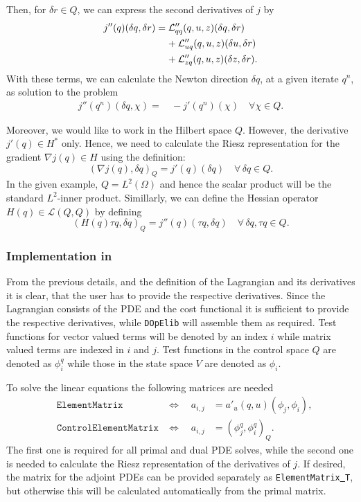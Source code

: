 {Then, for $\delta r\in Q$, we can express the second derivatives of $j$ by
\begin{align*}
j''(q)(\delta q, \delta r) 
&= {\cal L}_{qq}'' (q,u,z)(\delta q,\delta r) \\
&\;\;\;\;+ {\cal L}_{uq}'' (q,u,z)(\delta u,\delta r) \\ 
&\;\;\;\;+ {\cal L}_{zq}'' (q,u,z)(\delta z,\delta r).
\end{align*}
With these terms, we can calculate the Newton direction $\delta q$, at a given 
iterate $q^n$, as solution to the problem
\begin{align*}
j''(q^n )(\delta q,\chi ) =&\, -j'(q^n)(\chi) \quad\forall\chi \in Q.
\end{align*}

Moreover, we would like to work in the Hilbert space $Q$. However, the derivative 
$j'(q) \in H^*$ only. Hence, we need to calculate the Riesz representation 
for the gradient $\nabla j(q) \in H$ using the definition:
\[
 (\nabla j(q),\delta q)_Q = j'(q)(\delta q) \quad \forall\,\delta q\in Q.
\]
In the given example, $Q = L^2(\Omega)$ and hence the scalar product will be the
standard $L^2$-inner product. Simillarly, we can define the Hessian operator 
$H(q) \in \mathcal L(Q,Q)$ by defining
\[
 (H(q)\tau q,\delta q)_Q = j''(q)(\tau q,\delta q) \quad \forall\,\delta q,\tau q\in Q.
\]
}

\subsubsection{Implementation in \dope{}}
From the previous details, and the definition of the Lagrangian and its 
derivatives it is clear, that the user has to provide the respective derivatives. 
Since the Lagrangian consists of the PDE and the cost functional it 
is sufficient to provide the respective derivatives, while \texttt{DOpElib} 
will assemble them as required.
Test functions for vector valued terms will be denoted by an index $i$ while 
matrix valued terms are indexed in $i$ and $j$. Test functions in the control 
space $Q$ are denoted as $\phi^q_i$ while those in the state space $V$ are denoted 
as $\phi_i$.

To solve the linear equations the following matrices are needed{\color{red}
\begin{align*}
&\texttt{ElementMatrix} 
&\Leftrightarrow \quad a_{i,j} &= a'_u(q,u)(\phi_j,\phi_i), \\
&\texttt{ControlElementMatrix}  
&\Leftrightarrow \quad a_{i,j} &= (\phi^q_j, \phi^q_i)_Q.
\end{align*}}
The first one is required for all primal and dual PDE solves, while the second one is needed 
to calculate the Riesz representation of the derivatives of $j$. 
If desired, the matrix for the adjoint PDEs can be provided separately as 
\texttt{ElementMatrix\underline{ }T}, but otherwise this will be 
calculated automatically from the primal matrix.

